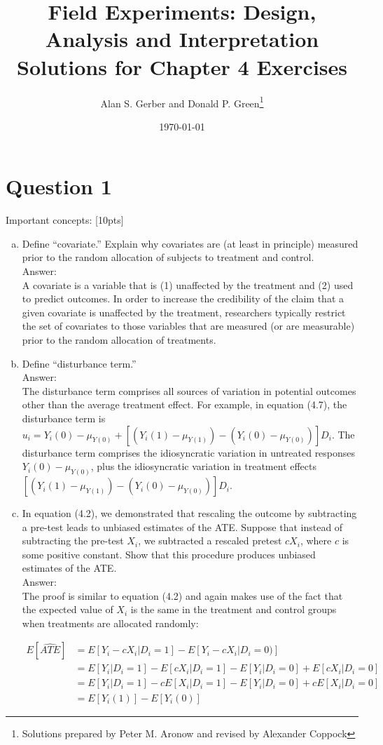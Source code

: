 \documentclass[11pt,notitlepage]{article}\usepackage[]{graphicx}\usepackage[]{color}
\title{Field Experiments: Design, Analysis and Interpretation \\
Solutions for Chapter 4 Exercises}
\author{Alan S. Gerber and Donald P. Green\footnote{Solutions prepared by Peter M. Aronow and revised by Alexander Coppock}}
\date{\today}
\begin{document}
\maketitle


\section*{Question 1}
Important concepts: [10pts]

\begin{enumerate}[a)]
\item Define ``covariate.''  Explain why covariates are (at least in principle) measured prior to the random allocation of subjects to treatment and control.\\
Answer:\\
A covariate is a variable that is (1) unaffected by the treatment and (2) used to predict outcomes. In order to increase the credibility of the claim that a given covariate is unaffected by the treatment, researchers typically restrict the set of covariates to those variables that are measured (or are measurable) prior to the random allocation of treatments.

\item Define ``disturbance term.''  \\
Answer:\\
The disturbance term comprises all sources of variation in potential outcomes other than the average treatment effect.  For example, in equation (4.7), the disturbance term is $u_i=Y_i (0)-\mu_{Y(0)}+[(Y_i (1)-\mu_{Y(1)} )-(Y_i (0)-\mu_{Y(0)})] D_i$.  The disturbance term comprises the idiosyncratic variation in untreated responses $Y_i (0)-\mu_{Y(0)}$, plus the idiosyncratic variation in treatment effects $[(Y_i (1)-\mu_{Y(1)})-(Y_i (0)-\mu_{Y(0)})] D_i.$  

\item In equation (4.2), we demonstrated that rescaling the outcome by subtracting a pre-test leads to unbiased estimates of the ATE. Suppose that instead of subtracting the pre-test $X_i$, we subtracted a rescaled pretest $cX_i$, where $c$ is some positive constant.  Show that this procedure produces unbiased estimates of the ATE. \\
Answer:\\
The proof is similar to equation (4.2) and again makes use of the fact that the expected value of $X_i$ is the same in the treatment and control groups when treatments are allocated randomly:

\begin{align*}
E[\widehat{ATE}] &=E[Y_i-cX_i |D_i=1]-E[Y_i-cX_i | D_i=0)]\\
&= E[Y_i|D_i=1]-E[cX_i|D_i=1]-E[Y_i|D_i=0]+E[cX_i|D_i=0]\\
&= E[Y_i|D_i=1]-cE[X_i|D_i=1]-E[Y_i|D_i=0]+cE[X_i|D_i=0]\\
&= E[Y_i(1)] - E[Y_i(0)]
\end{align*}


\end{enumerate}
\end{document}
